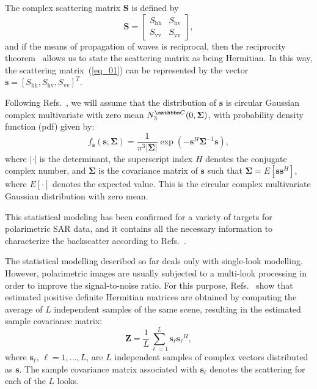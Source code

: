 \documentclass[conference]{IEEEtran}
\begin{document}
The complex scattering matrix $\mathbf{S}$ is defined by
\begin{equation}
\mathbf{S} = \left[
\begin{array}{cc}
	S_\text{hh}   & S_\text{hv}   \\
	S_{\text{vv}}   & S_{\text{vv}}   
\end{array}
\right],
\label{eq_01}
\end{equation}
and if the means of propagation of waves is reciprocal, then the reciprocity theorem~\cite{lp} allows us to state the scattering matrix as being Hermitian. 
In this way, the scattering matrix~(\ref{eq_01}) can be represented by the vector $\mathbf{s}=[S_\text{hh},S_\text{hv},S_{\text{vv}}]^T$.

Following Refs.~\cite{good, lee}, we will assume that the distribution of $\mathbf{s}$ is circular Gaussian complex multivariate with zero mean $N^{\mathbbm C}_3(0,\mathbf{\Sigma})$, with probability density function (pdf) given by:
\begin{equation}
    f_{\mathbf{s}}(\mathbf{s};\mathbf{\Sigma})=\frac{1}{\pi^3|\mathbf{\Sigma}|} \exp(-\mathbf{s}^H\mathbf{\Sigma}^{-1}\mathbf{s}),
    \label{eq_03}
\end{equation}
where $|\cdot|$ is the determinant, 
the superscript index $H$ denotes the conjugate complex number, 
and $\mathbf{\Sigma}$ is the covariance matrix of $\mathbf{s}$ such that $\mathbf{\Sigma}=E[\mathbf{ss}^H]$, where $E[\cdot]$ denotes the expected value. 
This is the circular complex multivariate Gaussian distribution with zero mean.

This statistical modeling has been confirmed for a variety of targets for polarimetric SAR data, and it contains all the necessary information to characterize the backscatter according to Refs.~\cite{sarabendi,mfp}.
 
The statistical modelling described so far deals only with single-look modelling.
However, polarimetric images are usually subjected to a multi-look processing in order to improve the signal-to-noise ratio. 
For this purpose, Refs.~\cite{good, ade} show that estimated positive definite Hermitian matrices are obtained by computing the average of $L$ independent samples of the same scene, resulting in the estimated sample covariance matrix:
\begin{equation}
    \mathbf{Z}=\frac{1}{L}\sum_{\ell=1}^{L} {\mathbf{s}_\ell}{\mathbf{s}_\ell}^H,
    \label{eq_04}
\end{equation}
where $\mathbf{s}_\ell$, $\ell = 1, \dots, L$, are $L$ independent samples of complex vectors distributed as $\mathbf{s}$. 
The sample covariance matrix associated with $\mathbf{s}_\ell$ denotes the scattering for each of the $L$ looks.
\end{document}
